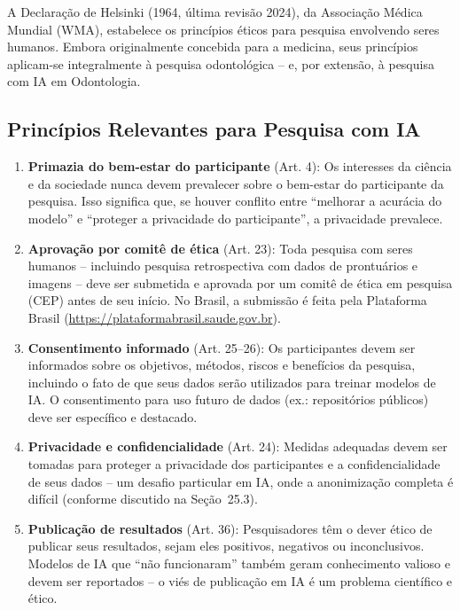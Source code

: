 A Declaração de Helsinki (1964, última revisão 2024), da Associação Médica
Mundial (WMA), estabelece os princípios éticos para pesquisa envolvendo seres
humanos. Embora originalmente concebida para a medicina, seus princípios
aplicam-se integralmente à pesquisa odontológica -- e, por extensão, à pesquisa
com IA em Odontologia.


\subsection{Princípios Relevantes para Pesquisa com IA}

\begin{enumerate}
  \item \textbf{Primazia do bem-estar do participante} (Art. 4): Os interesses
    da ciência e da sociedade nunca devem prevalecer sobre o bem-estar do
    participante da pesquisa. Isso significa que, se houver conflito entre
    ``melhorar a acurácia do modelo'' e ``proteger a privacidade do
    participante'', a privacidade prevalece.

  \item \textbf{Aprovação por comitê de ética} (Art. 23): Toda pesquisa com
    seres humanos -- incluindo pesquisa retrospectiva com dados de prontuários
    e imagens -- deve ser submetida e aprovada por um comitê de ética em
    pesquisa (CEP) antes de seu início. No Brasil, a submissão é feita pela
    Plataforma Brasil (\url{https://plataformabrasil.saude.gov.br}).

  \item \textbf{Consentimento informado} (Art. 25--26): Os participantes devem
    ser informados sobre os objetivos, métodos, riscos e benefícios da pesquisa,
    incluindo o fato de que seus dados serão utilizados para treinar modelos de
    IA. O consentimento para uso futuro de dados (ex.: repositórios públicos)
    deve ser específico e destacado.

  \item \textbf{Privacidade e confidencialidade} (Art. 24): Medidas adequadas
    devem ser tomadas para proteger a privacidade dos participantes e a
    confidencialidade de seus dados -- um desafio particular em IA, onde a
    anonimização completa é difícil (conforme discutido na Seção~25.3).

  \item \textbf{Publicação de resultados} (Art. 36): Pesquisadores têm o dever
    ético de publicar seus resultados, sejam eles positivos, negativos ou
    inconclusivos. Modelos de IA que ``não funcionaram'' também geram
    conhecimento valioso e devem ser reportados -- o viés de publicação em IA
    é um problema científico e ético.
\end{enumerate}

